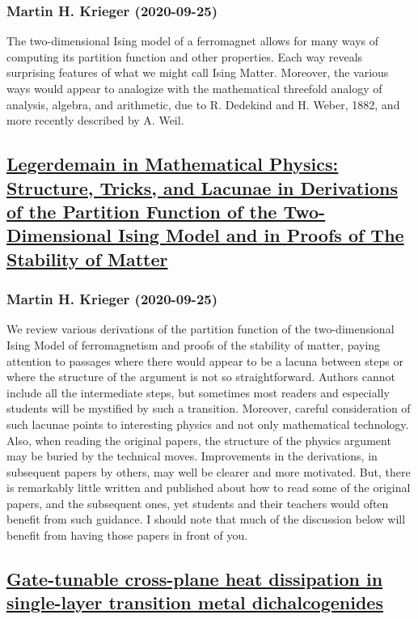 \subsubsection*{Martin H. Krieger (2020-09-25)}
The two-dimensional Ising model of a ferromagnet allows for many ways of
computing its partition function and other properties. Each way reveals
surprising features of what we might call Ising Matter. Moreover, the various
ways would appear to analogize with the mathematical threefold analogy of
analysis, algebra, and arithmetic, due to R. Dedekind and H. Weber, 1882, and
more recently described by A. Weil.

\subsection*{\href{http://arxiv.org/abs/2009.12016v1}{Legerdemain in Mathematical Physics: Structure, Tricks, and Lacunae in  Derivations of the Partition Function of the Two-Dimensional Ising Model and  in Proofs of The Stability of Matter}}
\subsubsection*{Martin H. Krieger (2020-09-25)}
We review various derivations of the partition function of the
two-dimensional Ising Model of ferromagnetism and proofs of the stability of
matter, paying attention to passages where there would appear to be a lacuna
between steps or where the structure of the argument is not so straightforward.
Authors cannot include all the intermediate steps, but sometimes most readers
and especially students will be mystified by such a transition. Moreover,
careful consideration of such lacunae points to interesting physics and not
only mathematical technology. Also, when reading the original papers, the
structure of the physics argument may be buried by the technical moves.
Improvements in the derivations, in subsequent papers by others, may well be
clearer and more motivated. But, there is remarkably little written and
published about how to read some of the original papers, and the subsequent
ones, yet students and their teachers would often benefit from such guidance. I
should note that much of the discussion below will benefit from having those
papers in front of you.

\subsection*{\href{http://arxiv.org/abs/2009.12006v1}{Gate-tunable cross-plane heat dissipation in single-layer transition  metal dichalcogenides}}
